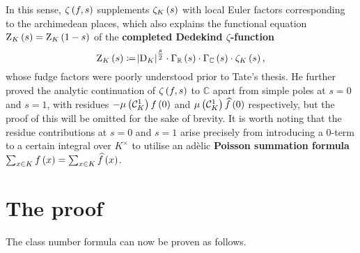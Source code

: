 \documentclass{article}
\newcommand{\1}{\mathbbm{1}}
\newcommand{\br}{\del}
\newcommand{\CC}{\mathbb{C}}
\newcommand{\CCC}{\mathcal{C}}
\newcommand{\D}{\mathrm{D}}
\newcommand{\RR}{\mathbb{R}}
\newcommand{\Z}{\mathrm{Z}}
\begin{document}
In this sense, $ \zeta\br{f, s} $ supplements $ \zeta_K\br{s} $ with local Euler factors corresponding to the archimedean places, which also explains the functional equation $ \Z_K\br{s} = \Z_K\br{1 - s} $ of the \textbf{completed Dedekind $ \zeta $-function}
$$ \Z_K\br{s} \coloneqq \abs{\D_K}^{\tfrac{s}{2}} \cdot \Gamma_\RR\br{s} \cdot \Gamma_\CC\br{s} \cdot \zeta_K\br{s}, $$
whose fudge factors were poorly understood prior to Tate's thesis. He further proved the analytic continuation of $ \zeta\br{f, s} $ to $ \CC $ apart from simple poles at $ s = 0 $ and $ s = 1 $, with residues $ -\mu\br{\CCC_K^1}f\br{0} $ and $ \mu\br{\CCC_K^1}\widehat{f}\br{0} $ respectively, but the proof of this will be omitted for the sake of brevity. It is worth noting that the residue contributions at $ s = 0 $ and $ s = 1 $ arise precisely from introducing a $ 0 $-term to a certain integral over $ K^\times $ to utilise an ad\`elic \textbf{Poisson summation formula} $ \sum_{x \in K} f\br{x} = \sum_{x \in K} \widehat{f}\br{x} $.

\section{The proof}

The class number formula can now be proven as follows.
\end{document}
